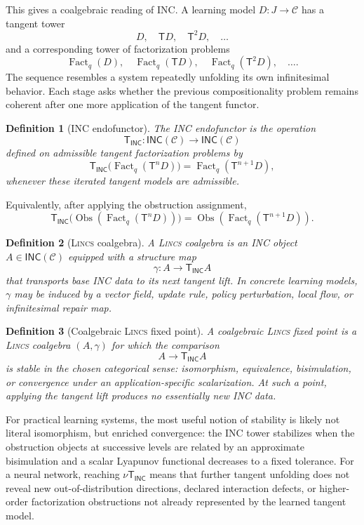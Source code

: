 \documentclass{article}
\newtheorem{definition}{Definition}
\newcommand{\C}{\mathcal{C}}
\newcommand{\T}{\mathsf{T}}
\newcommand{\INC}{\mathsf{INC}}
\newcommand{\Fact}{\operatorname{Fact}}
\newcommand{\Obs}{\operatorname{Obs}}
\begin{document}
This gives a coalgebraic reading of INC. A learning model \(D:J\to\C\) has a tangent tower
\[
D,\quad \T D,\quad \T^2D,\quad \ldots
\]
and a corresponding tower of factorization problems
\[
\Fact_q(D),\quad
\Fact_q(\T D),\quad
\Fact_q(\T^2D),\quad \ldots .
\]
The sequence resembles a system repeatedly unfolding its own infinitesimal behavior. Each stage asks whether the previous compositionality problem remains coherent after one more application of the tangent functor.

\begin{definition}[INC endofunctor]
The INC endofunctor is the operation
\[
\T_{\INC}:\mathsf{INC}(\C)\to\mathsf{INC}(\C)
\]
defined on admissible tangent factorization problems by
\[
\T_{\INC}\big(\Fact_q(\T^nD)\big)
  =
  \Fact_q(\T^{n+1}D),
\]
whenever these iterated tangent models are admissible.
\end{definition}

Equivalently, after applying the obstruction assignment,
\[
\T_{\INC}\big(\Obs(\Fact_q(\T^nD))\big)
  =
  \Obs(\Fact_q(\T^{n+1}D)).
\]

\begin{definition}[\textsc{Lincs}   coalgebra]
A \textsc{Lincs}   coalgebra is an INC object \(A\in\mathsf{INC}(\C)\) equipped with a structure map
\[
\gamma:A\to \T_{\INC}A
\]
that transports base INC data to its next tangent lift. In concrete learning models, \(\gamma\) may be induced by a vector field, update rule, policy perturbation, local flow, or infinitesimal repair map.
\end{definition}

\begin{definition}[Coalgebraic \textsc{Lincs}   fixed point]
A coalgebraic \textsc{Lincs}   fixed point is a \textsc{Lincs}   coalgebra \((A,\gamma)\) for which the comparison
\[
A\longrightarrow \T_{\INC}A
\]
is stable in the chosen categorical sense: isomorphism, equivalence, bisimulation, or convergence under an application-specific scalarization. At such a point, applying the tangent lift produces no essentially new INC data.
\end{definition}

For practical learning systems, the most useful notion of stability is likely not literal isomorphism, but enriched convergence: the INC tower stabilizes when the obstruction objects at successive levels are related by an approximate bisimulation and a scalar Lyapunov functional decreases to a fixed tolerance. For a neural network, reaching \(\nu\T_{\INC}\) means that further tangent unfolding does not reveal new out-of-distribution directions, declared interaction defects, or higher-order factorization obstructions not already represented by the learned tangent model.
\end{document}
